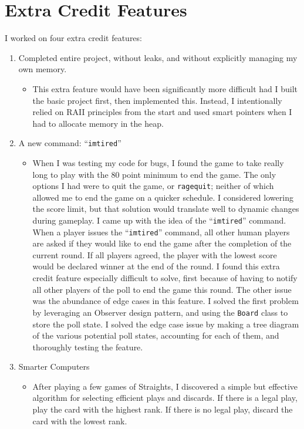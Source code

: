 \documentclass[12pt]{article}
\begin{document}
	\section{Extra Credit Features}
		I worked on four extra credit features:
		\begin{enumerate}
			\item Completed entire project, without leaks, and without explicitly managing my own memory.
				\begin{itemize}
					\item This extra feature would have been significantly more difficult had I built the basic project first, then implemented this. Instead, I intentionally relied on RAII principles from the start and used smart pointers when I had to allocate memory in the heap.
				\end{itemize}
			\item A new command: ``\texttt{imtired}''
				\begin{itemize}
					\item When I was testing my code for bugs, I found the game to take really long to play with the 80 point minimum to end the game. The only options I had were to quit the game, or \texttt{ragequit}; neither of which allowed me to end the game on a quicker schedule. I considered lowering the score limit, but that solution would translate well to dynamic changes during gameplay.
						I came up with the idea of the ``\texttt{imtired}'' command. When a player issues the ``\texttt{imtired}'' command, all other human players are asked if they would like to end the game after the completion of the current round. If all players agreed, the player with the lowest score would be declared winner at the end of the round.
						I found this extra credit feature especially difficult to solve, first because of having to notify all other players of the poll to end the game this round. The other issue was the abundance of edge cases in this feature.
						I solved the first problem by leveraging an Observer design pattern, and using the \texttt{Board} class to store the poll state. I solved the edge case issue by making a tree diagram of the various potential poll states, accounting for each of them, and thoroughly testing the feature.
				\end{itemize}
			\item Smarter Computers
				\begin{itemize}
					\item After playing a few games of Straights, I discovered a simple but effective algorithm for selecting efficient plays and discards. If there is a legal play, play the card with the highest rank. If there is no legal play, discard the card with the lowest rank.

\end{itemize}
\end{enumerate}
\end{document}
